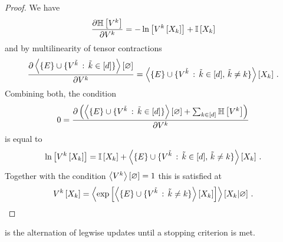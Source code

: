 \begin{proof}
    We have
    \begin{align*}
        \frac{\partial \mathbb{H}\left[V^{k}\right]}{\partial V^{k}}
        =  - \ln \left[ V^{k}\left[X_{k}\right] \right]
        + \mathbb{I}\left[X_{k}\right]
    \end{align*}
    and by multilinearity of tensor contractions
    \begin{align*}
        \frac{\partial \left\langle \{E\}\cup\{V^{\tilde{k}} \, : \, \tilde{k}\in[d] \}\right\rangle \left[ \varnothing \right]}{\partial V^{k}}
        =  \left\langle \{E\}\cup\{V^{\tilde{k}} \, : \, \tilde{k}\in[d] ,\, \tilde{k}\neq k \}\right\rangle \left[ X_{k} \right] \, .
    \end{align*}
    Combining both, the condition
    \begin{align*}
        0 = \frac{\partial 
            \left( \left\langle \{E\}\cup\{V^{\tilde{k}} \, : \, \tilde{k}\in[d] \}\right\rangle \left[ \varnothing \right] + \sum_{k\in[d]} \mathbb{H}\left[V^{k}\right] \right)
        }{\partial V^{k}}
    \end{align*}
    is equal to
    \begin{align*}
        \ln \left[ V^{k}\left[X_{k}\right] \right] =
        \mathbb{I}\left[X_{k}\right] + \left\langle \{E\}\cup\{V^{\tilde{k}} \, : \, \tilde{k}\in[d] ,\, \tilde{k}\neq k \}\right\rangle \left[ X_{k} \right] \, .
    \end{align*}
    Together with the condition $\left\langle V^{k}\right\rangle \left[ \varnothing \right]=1$ this is satisfied at
    \[ V^{k}\left[X_{k}\right]
    = \left\langle  \mathrm{exp}\left[ \left\langle  \{E\}\cup
    \{V^{\tilde{k}} \, : \, \tilde{k}\neq k\} \right\rangle \left[ X_{k} \right] \right]
    \right\rangle \left[ X_{k} | \varnothing \right] \, . \]
\end{proof}

 is the alternation of legwise updates until a stopping criterion is met.

